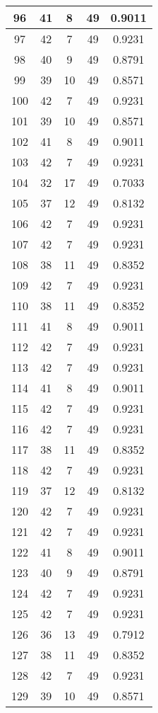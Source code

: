 \documentclass[letterpaper, 12pt]{article}
\begin{document}
\begin{longtable}{|c|c|c|c|c|}
\hline
96 & 41 & 8 & 49 & 0.9011 \\
\hline
97 & 42 & 7 & 49 & 0.9231 \\
\hline
98 & 40 & 9 & 49 & 0.8791 \\
\hline
99 & 39 & 10 & 49 & 0.8571 \\
\hline
100 & 42 & 7 & 49 & 0.9231 \\
\hline
101 & 39 & 10 & 49 & 0.8571 \\
\hline
102 & 41 & 8 & 49 & 0.9011 \\
\hline
103 & 42 & 7 & 49 & 0.9231 \\
\hline
104 & 32 & 17 & 49 & 0.7033 \\
\hline
105 & 37 & 12 & 49 & 0.8132 \\
\hline
106 & 42 & 7 & 49 & 0.9231 \\
\hline
107 & 42 & 7 & 49 & 0.9231 \\
\hline
108 & 38 & 11 & 49 & 0.8352 \\
\hline
109 & 42 & 7 & 49 & 0.9231 \\
\hline
110 & 38 & 11 & 49 & 0.8352 \\
\hline
111 & 41 & 8 & 49 & 0.9011 \\
\hline
112 & 42 & 7 & 49 & 0.9231 \\
\hline
113 & 42 & 7 & 49 & 0.9231 \\
\hline
114 & 41 & 8 & 49 & 0.9011 \\
\hline
115 & 42 & 7 & 49 & 0.9231 \\
\hline
116 & 42 & 7 & 49 & 0.9231 \\
\hline
117 & 38 & 11 & 49 & 0.8352 \\
\hline
118 & 42 & 7 & 49 & 0.9231 \\
\hline
119 & 37 & 12 & 49 & 0.8132 \\
\hline
120 & 42 & 7 & 49 & 0.9231 \\
\hline
121 & 42 & 7 & 49 & 0.9231 \\
\hline
122 & 41 & 8 & 49 & 0.9011 \\
\hline
123 & 40 & 9 & 49 & 0.8791 \\
\hline
124 & 42 & 7 & 49 & 0.9231 \\
\hline
125 & 42 & 7 & 49 & 0.9231 \\
\hline
126 & 36 & 13 & 49 & 0.7912 \\
\hline
127 & 38 & 11 & 49 & 0.8352 \\
\hline
128 & 42 & 7 & 49 & 0.9231 \\
\hline
129 & 39 & 10 & 49 & 0.8571 \\

\end{longtable}
\end{document}
